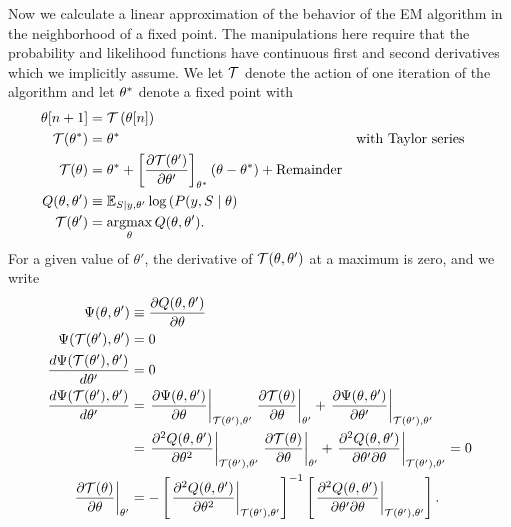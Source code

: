 Now we calculate a linear approximation of the behavior of the EM
algorithm in the neighborhood of a fixed point.  The manipulations
here require that the probability and likelihood functions have
continuous first and second derivatives which we implicitly assume.
We let $\EMmap$ denote the action of one iteration of the algorithm and
let ${\theta^*}$ denote a fixed point with
\begin{align}
  \ti{\theta}{n+1} &= \EMmap\left( \ti{\theta}{n} \right) \\
  \EMmap(\EMfixedPoint) &= \EMfixedPoint && \text{with Taylor series} \\
  \EMmap(\theta) &= \EMfixedPoint + \left[ \frac{\partial
                 \EMmap(\theta')}{\partial \theta'} \right]_{\EMfixedPoint} (\theta - \EMfixedPoint) + \text{Remainder} \\
  Q(\theta, \theta') &\equiv \EV_{S|y,\theta'} \log\left(P(y,S \given
  \theta \right) \\
  \EMmap(\theta') &= \argmax_\theta Q(\theta, \theta'). 
\end{align}
For a given value of $\theta'$, the derivative of $\EMmap(\theta,
\theta')$ at a maximum is zero, and we write
\begin{align}
  \Psi(\theta,\theta')
  &\equiv \frac{\partial Q(\theta,
    \theta')}{\partial \theta} \\
  \Psi(\EMmap(\theta'), \theta')
  &= 0 \\
  \frac{d\Psi(\EMmap(\theta'), \theta')}{d \theta'}
  &= 0 \\
  \frac{d\Psi(\EMmap(\theta'), \theta')}{d \theta'}
  &= \left. \frac{\partial \Psi(\theta, \theta')}{\partial \theta}
    \right|_{\EMmap(\theta'), \theta'} \left.\frac{\partial
    \EMmap(\theta)}{\partial \theta} \right|_{\theta'} +
    \left. \frac{\partial \Psi(\theta, \theta')}{\partial \theta'}
    \right|_{\EMmap(\theta'), \theta'} \\
  &= \left. \frac{\partial^2 Q(\theta, \theta')}{\partial \theta^2}
    \right|_{\EMmap(\theta'), \theta'} \left.\frac{\partial
    \EMmap(\theta)}{\partial \theta} \right|_{\theta'} +
    \left. \frac{\partial^2 Q(\theta, \theta')}{\partial \theta'
    \partial \theta} \right|_{\EMmap(\theta'), \theta'} =0 \\
  \label{eq:two_second_derivatives}
  \left.\frac{\partial \EMmap(\theta)}{\partial \theta}
  \right|_{\theta'}
  &= - \left[ \left. \frac{\partial^2 Q(\theta,  \theta')}{\partial
    \theta^2} \right|_{\EMmap(\theta'), \theta'} \right]^{-1} \left[
    \left. \frac{\partial^2 Q(\theta, \theta')}{\partial \theta'
    \partial \theta} \right|_{\EMmap(\theta'), \theta'} \right].
\end{align}
